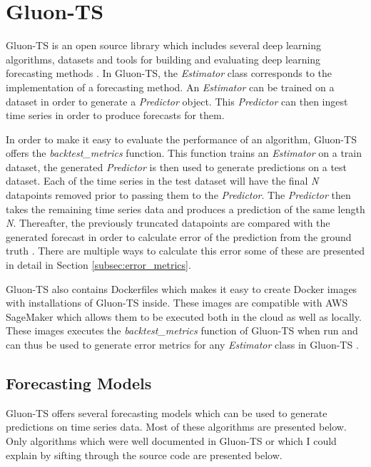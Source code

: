 \section{Gluon-TS}
\label{subsec:gluonts_overview}
Gluon-TS is an open source library which includes several deep learning algorithms, datasets and tools for building and evaluating deep learning forecasting methods \cite{gluonts-website,gluonts_paper,gluonts-github}. In Gluon-TS, the \textit{Estimator} class corresponds to the implementation of a forecasting method. An \textit{Estimator} can be trained on a dataset in order to generate a \textit{Predictor} object. This \textit{Predictor} can then ingest time series in order to produce forecasts for them.

In order to make it easy to evaluate the performance of an algorithm, Gluon-TS offers the \textit{backtest\_metrics} function. This function trains an \textit{Estimator} on a train dataset, the generated \textit{Predictor} is then used to generate predictions on a test dataset. Each of the time series in the test dataset will have the final \textit{N} datapoints removed prior to passing them to the \textit{Predictor}. The \textit{Predictor} then takes the remaining time series data and produces a prediction of the same length \textit{N}. Thereafter, the previously truncated datapoints are compared with the generated forecast in order to calculate error of the prediction from the ground truth \cite{gluonts-github}. There are multiple ways to calculate this error some of these are presented in detail in Section \ref{subsec:error_metrics}.

Gluon-TS also contains Dockerfiles which makes it easy to create Docker images with installations of Gluon-TS inside. These images are compatible with AWS SageMaker which allows them to be executed both in the cloud as well as locally. These images executes the \textit{backtest\_metrics} function of Gluon-TS when run and can thus be used to generate error metrics for any \textit{Estimator} class in Gluon-TS \cite{gluonts-github}.

\subsection{Forecasting Models}
\label{algorithms}
Gluon-TS offers several forecasting models which can be used to generate predictions on time series data. Most of these algorithms are presented below. Only algorithms which were well documented in Gluon-TS or which I could explain by sifting through the source code are presented below.

